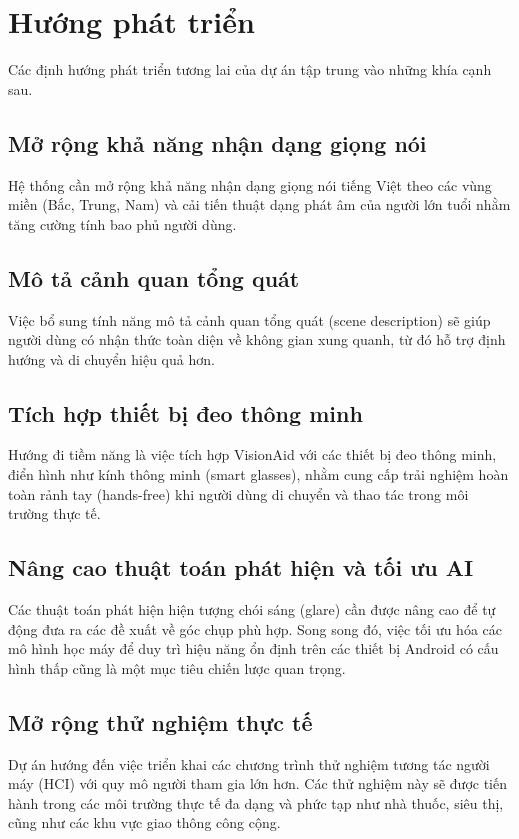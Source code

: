 \documentclass[a4paper,13pt]{report}
\begin{document}
\section{Hướng phát triển}

Các định hướng phát triển tương lai của dự án tập trung vào những khía cạnh sau.

\subsection{Mở rộng khả năng nhận dạng giọng nói}
Hệ thống cần mở rộng khả năng nhận dạng giọng nói tiếng Việt theo các vùng miền (Bắc, Trung, Nam) và cải tiến thuật dạng phát âm của người lớn tuổi nhằm tăng cường tính bao phủ người dùng.

\subsection{Mô tả cảnh quan tổng quát}
Việc bổ sung tính năng mô tả cảnh quan tổng quát (scene description) sẽ giúp người dùng có nhận thức toàn diện về không gian xung quanh, từ đó hỗ trợ định hướng và di chuyển hiệu quả hơn.

\subsection{Tích hợp thiết bị đeo thông minh}
Hướng đi tiềm năng là việc tích hợp VisionAid với các thiết bị đeo thông minh, điển hình như kính thông minh (smart glasses), nhằm cung cấp trải nghiệm hoàn toàn rảnh tay (hands-free) khi người dùng di chuyển và thao tác trong môi trường thực tế.

\subsection{Nâng cao thuật toán phát hiện và tối ưu AI}
Các thuật toán phát hiện hiện tượng chói sáng (glare) cần được nâng cao để tự động đưa ra các đề xuất về góc chụp phù hợp. Song song đó, việc tối ưu hóa các mô hình học máy để duy trì hiệu năng ổn định trên các thiết bị Android có cấu hình thấp cũng là một mục tiêu chiến lược quan trọng.

\subsection{Mở rộng thử nghiệm thực tế}
Dự án hướng đến việc triển khai các chương trình thử nghiệm tương tác người máy (HCI) với quy mô người tham gia lớn hơn. Các thử nghiệm này sẽ được tiến hành trong các môi trường thực tế đa dạng và phức tạp như nhà thuốc, siêu thị, cũng như các khu vực giao thông công cộng.
\end{document}
